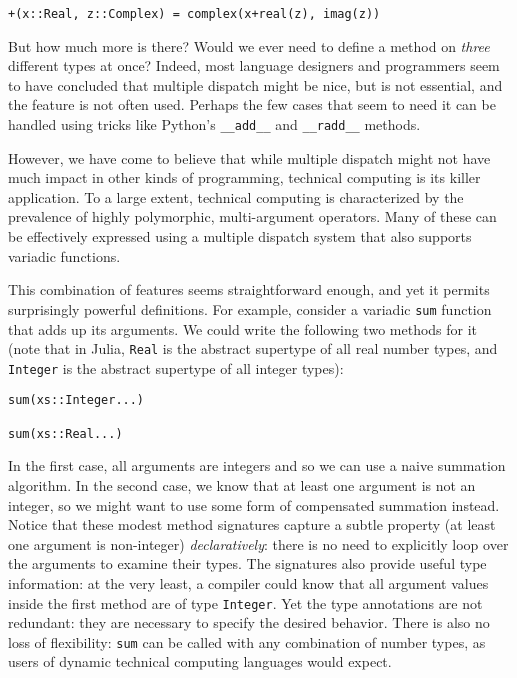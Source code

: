 \documentclass[preprint]{sigplanconf}
\newcommand{\code}[1]{\texttt{#1}}
\begin{document}
\begin{verbatim}
+(x::Real, z::Complex) = complex(x+real(z), imag(z))
\end{verbatim}

But how much more is there? Would we ever need to define a method on
\emph{three} different types at once? Indeed, most language designers and
programmers seem to have concluded that multiple dispatch might be nice, but is
not essential, and the feature is not often used.
Perhaps the few cases that seem to need it can be handled using tricks like
Python's \code{\_\_add\_\_} and \code{\_\_radd\_\_} methods.

However, we have come to believe that while multiple dispatch might not
have much impact in other kinds of programming, technical computing is its
killer application. To a large extent, technical computing is characterized
by the prevalence of highly polymorphic, multi-argument operators. Many of
these can be effectively expressed using a multiple dispatch system that also
supports variadic functions.

This combination of features seems straightforward
enough, and yet it permits surprisingly powerful definitions. For example,
consider a variadic \code{sum} function that adds up its arguments. We could
write the following two methods for it (note that in Julia, \code{Real} is
the abstract supertype of all real number types, and \code{Integer} is the
abstract supertype of all integer types):

\begin{verbatim}
sum(xs::Integer...)

sum(xs::Real...)
\end{verbatim}

In the first case, all arguments are integers and so we can use a naive
summation algorithm. In the second case, we know that at least one argument
is not an integer, so we might want to use some form of compensated
summation instead. Notice that these modest method signatures
capture a subtle property (at least one argument is non-integer)
\emph{declaratively}: there is no need to explicitly loop over the arguments
to examine their types. The signatures also provide useful type information:
at the very least, a compiler could know that all argument values inside
the first method are of type \code{Integer}. Yet the type annotations
are not redundant: they are necessary to specify the desired behavior. There
is also no loss of flexibility: \code{sum} can be called with any combination
of number types, as users of dynamic technical computing languages would expect.
\end{document}
